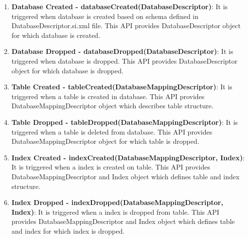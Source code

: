 		\begin{enumerate}

			\item \small \textbf{Database Created - databaseCreated(DatabaseDescriptor)}: It is triggered when database is created based on schema defined in DatabaseDescriptor.si.xml file. This API provides DatabaseDescriptor object for which database is created.

			\item \small \textbf{Database Dropped - databaseDropped(DatabaseDescriptor)}: It is triggered when database is dropped. This API provides DatabaseDescriptor object for which database is dropped.


			\item \small \textbf{Table Created - tableCreated(DatabaseMappingDescriptor)}: It is triggered when a table is created in database. This API provides DatabaseMappingDescriptor object which describes table structure.


			\item \small \textbf{Table Dropped - tableDropped(DatabaseMappingDescriptor)}: It is triggered when a table is deleted from database. This API provides DatabaseMappingDescriptor object for which table is dropped.


			\item \small \textbf{Index Created - indexCreated(DatabaseMappingDescriptor, Index)}: It is triggered when a index is created on table. This API provides DatabaseMappingDescriptor and Index object which defines table and index structure.

			
			\item \small \textbf{Index Dropped - indexDropped(DatabaseMappingDescriptor, Index)}: It is triggered when a index is dropped from table. This API provides DatabaseMappingDescriptor and Index object which defines table and index for which index is dropped.

		\end{enumerate}
